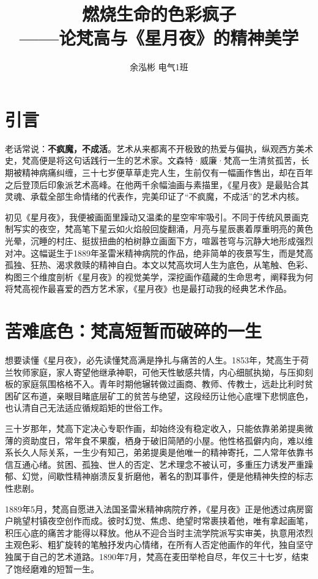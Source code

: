 \documentclass[12pt,a4paper]{article}
\title{燃烧生命的色彩疯子\\——论梵高与《星月夜》的精神美学}
\author{余泓彬 \quad 电气1班 \quad 2024312506}
\date{}
\begin{document}
\maketitle

\section{引言}
老话常说：\textbf{不疯魔，不成活}。艺术从来都离不开极致的热爱与偏执，纵观西方美术史，梵高便是将这句话践行一生的艺术家。文森特·威廉·梵高一生清贫孤苦，长期被精神病痛纠缠，三十七岁便草草走完人生，生前仅有一幅画作售出，却在百年之后登顶后印象派艺术高峰。在他两千余幅油画与素描里，《星月夜》是最贴合其灵魂、承载全部生命情绪的代表作，完美印证了“不疯魔，不成活”的艺术内核。

初见《星月夜》，我便被画面里躁动又温柔的星空牢牢吸引。不同于传统风景画克制写实的夜空，梵高笔下星云如火焰般回旋翻涌，月亮与星辰裹着厚重明亮的黄色光晕，沉睡的村庄、挺拔扭曲的柏树静立画面下方，喧嚣苍穹与沉静大地形成强烈对冲。这幅诞生于1889年圣雷米精神病院的作品，绝非简单的夜景写生，而是梵高孤独、狂热、渴求救赎的精神自白。本文以梵高坎坷人生为底色，从笔触、色彩、构图三个维度剖析《星月夜》的视觉美学，深挖画作蕴藏的生命思考，阐释我为何将梵高视作最喜爱的西方艺术家，《星月夜》也是最打动我的经典艺术作品。

\section{苦难底色：梵高短暂而破碎的一生}
想要读懂《星月夜》，必先读懂梵高满是挣扎与痛苦的人生。1853年，梵高生于荷兰牧师家庭，家人寄望他继承神职，可他天性敏感共情，内心细腻执拗，与压抑刻板的家庭氛围格格不入。青年时期他辗转做过画商、教师、传教士，远赴比利时贫困矿区布道，亲眼目睹底层矿工的贫苦与绝望，这段经历让他心底埋下悲悯底色，也认清自己无法适应循规蹈矩的世俗工作。

三十岁那年，梵高下定决心专职作画，却始终没有稳定收入，只能依靠弟弟提奥微薄的资助度日，常年食不果腹，栖身于破旧简陋的小屋。他性格孤僻内向，难以维系长久人际关系，一生少有知己，弟弟提奥是他唯一的精神寄托，二人常年依靠书信互通心绪。贫困、孤独、世人的否定、艺术理念不被认可，多重压力诱发严重躁郁、幻觉，间歇性精神崩溃反复折磨他，著名的割耳事件，便是他精神失控的标志性悲剧。

1889年5月，梵高自愿进入法国圣雷米精神病院疗养，《星月夜》正是他透过病房窗户眺望村镇夜空创作而成。彼时幻觉、焦虑、绝望时常裹挟着他，唯有拿起画笔，积压心底的痛苦才能得以释放。他从不迎合当时主流学院派写实审美，执意用浓烈主观色彩、粗犷旋转的笔触抒发内心情绪，在所有人否定他画作的年代，独自坚守独属于自己的艺术道路。1890年7月，梵高在麦田举枪自尽，年仅三十七岁，结束了饱经磨难的短暂一生。
\end{document}
